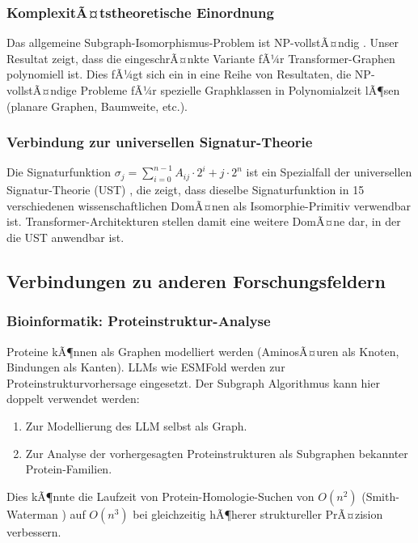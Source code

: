 ﻿\documentclass[a4paper,12pt]{article}
\theoremstyle{definition}
\begin{document}
\subsubsection{KomplexitÃ¤tstheoretische Einordnung}

Das allgemeine Subgraph-Isomorphismus-Problem ist NP-vollstÃ¤ndig
\cite{cook1971complexity}. Unser Resultat zeigt, dass die eingeschrÃ¤nkte
Variante fÃ¼r Transformer-Graphen polynomiell ist. Dies fÃ¼gt sich ein in
eine Reihe von Resultaten, die NP-vollstÃ¤ndige Probleme fÃ¼r spezielle
Graphklassen in Polynomialzeit lÃ¶sen (planare Graphen, Baumweite, etc.).

\subsubsection{Verbindung zur universellen Signatur-Theorie}

Die Signaturfunktion $\sigma_j = \sum_{i=0}^{n-1} A_{ij} \cdot 2^i + j \cdot 2^n$
ist ein Spezialfall der universellen Signatur-Theorie (UST) \cite{epp2026ust},
die zeigt, dass dieselbe Signaturfunktion in 15 verschiedenen wissenschaftlichen
DomÃ¤nen als Isomorphie-Primitiv verwendbar ist. Transformer-Architekturen
stellen damit eine weitere DomÃ¤ne dar, in der die UST anwendbar ist.

\subsection{Verbindungen zu anderen Forschungsfeldern}

\subsubsection{Bioinformatik: Proteinstruktur-Analyse}

Proteine kÃ¶nnen als Graphen modelliert werden (AminosÃ¤uren als Knoten,
Bindungen als Kanten). LLMs wie ESMFold \cite{lin2023evolutionary} werden
zur Proteinstrukturvorhersage eingesetzt. Der Subgraph Algorithmus kann
hier doppelt verwendet werden:
\begin{enumerate}
	\item Zur Modellierung des LLM selbst als Graph.
	\item Zur Analyse der vorhergesagten Proteinstrukturen als Subgraphen
	      bekannter Protein-Familien.
\end{enumerate}
Dies kÃ¶nnte die Laufzeit von Protein-Homologie-Suchen von $O(n^2)$
(Smith-Waterman \cite{smith1981identification}) auf $O(n^3)$ bei gleichzeitig
hÃ¶herer struktureller PrÃ¤zision verbessern.
\end{document}
